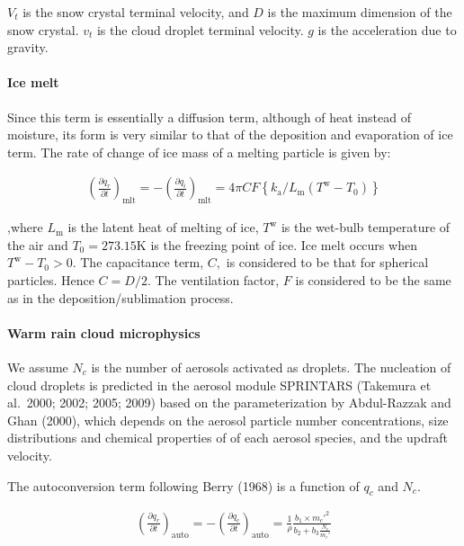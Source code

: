\(V_{t}\) is the snow crystal terminal velocity, and \(D\) is the
maximum dimension of the snow crystal. \(v_{t}\) is the cloud droplet
terminal velocity. \(g\) is the acceleration due to gravity.

\hypertarget{ice-melt}{%
\paragraph{Ice melt}\label{ice-melt}}

Since this term is essentially a diffusion term, although of heat
instead of moisture, its form is very similar to that of the deposition
and evaporation of ice term. The rate of change of ice mass of a melting
particle is given by:

\begin{eqnarray}
\left(\frac{\partial q_r}{\partial t}\right)_{\text {mlt}}
=-\left(\frac{\partial q_i}{\partial t}\right)_{\text {mlt}}
=4 \pi C F\left\{k_{\mathrm{a}} / L_{\mathrm{m}}\left(T^{\mathrm{w}}-T_{0}\right)\right\}
\end{eqnarray}

,where \(L_{\mathrm{m}}\) is the latent heat of melting of ice,
\(T^{\mathrm{w}}\) is the wet-bulb temperature of the air and
\(T_{0}=273.15\mathrm{K}\) is the freezing point of ice. Ice melt occurs
when \(T^{\mathrm{w}}-T_{0}>0\). The capacitance term, \(C,\) is
considered to be that for spherical particles. Hence \(C=D / 2 .\) The
ventilation factor, \(F\) is considered to be the same as in the
deposition/sublimation process.

\hypertarget{warm-rain-cloud-microphysics}{%
\paragraph{Warm rain cloud
microphysics}\label{warm-rain-cloud-microphysics}}

We assume \(N_c\) is the number of aerosols activated as droplets. The
nucleation of cloud droplets is predicted in the aerosol module
SPRINTARS (Takemura et al.~2000; 2002; 2005; 2009) based on the
parameterization by Abdul-Razzak and Ghan (2000), which depends on the
aerosol particle number concentrations, size distributions and chemical
properties of of each aerosol species, and the updraft velocity.

The autoconversion term following Berry (1968) is a function of \(q_c\)
and \(N_c\).

\begin{eqnarray}
\left(\frac{\partial q_r}{\partial t}\right)_{\text {auto}}
=-\left(\frac{\partial q_c}{\partial t}\right)_{\text {auto}}
=\frac{1}{\rho}
\frac{b_1 \times m_{c}'^{2}}{b_2+b_3 \frac{N_{c}}{m_{c}'}}
\end{eqnarray}

